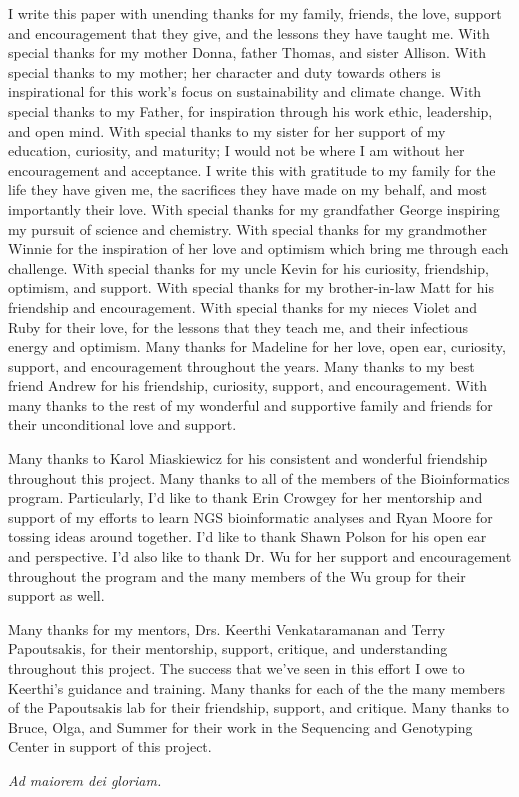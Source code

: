 
I write this paper with unending thanks for my family, friends, the love, support and encouragement that they give, and the lessons they have taught me. With special thanks for my mother Donna, father Thomas, and sister Allison. With special thanks to my mother; her character and duty towards others is inspirational for this work's focus on sustainability and climate change. With special thanks to my Father, for inspiration through his work ethic, leadership, and open mind. With special thanks to my sister for her support of my education, curiosity, and maturity; I would not be where I am without her encouragement and acceptance. I write this with gratitude to my family for the life they have given me, the sacrifices they have made on my behalf, and most importantly their love. With special thanks for my grandfather George inspiring my pursuit of science and chemistry. With special thanks for my grandmother Winnie for the inspiration of her love and optimism which bring me through each challenge. With special thanks for my uncle Kevin for his curiosity, friendship, optimism, and support. With special thanks for my brother-in-law Matt for his friendship and encouragement. With special thanks for my nieces Violet and Ruby for their love, for the lessons that they teach me, and their infectious energy and optimism. Many thanks for Madeline for her love, open ear, curiosity, support, and encouragement throughout the years.  Many thanks to my best friend Andrew for his friendship, curiosity, support, and encouragement. With many thanks to the rest of my wonderful and supportive family and friends for their unconditional love and support. 

Many thanks to Karol Miaskiewicz for his consistent and wonderful friendship throughout this project. Many thanks to all of the members of the Bioinformatics program. Particularly, I'd like to thank Erin Crowgey for her mentorship and support of my efforts to learn NGS bioinformatic analyses and Ryan Moore for tossing ideas around together. I'd like to thank Shawn Polson for his open ear and perspective. I'd also like to thank Dr. Wu for her support and encouragement throughout the program and the many members of the Wu group for their support as well.

Many thanks for my mentors, Drs. Keerthi Venkataramanan and Terry Papoutsakis, for their mentorship, support, critique, and understanding throughout this project. The success that we've seen in this effort I owe to Keerthi's guidance and training. Many thanks for each of the the many members of the Papoutsakis lab for their friendship, support, and critique. Many thanks to Bruce, Olga, and Summer for their work in the Sequencing and Genotyping Center in support of this project.

{\centerline {\it Ad maiorem dei gloriam.}}